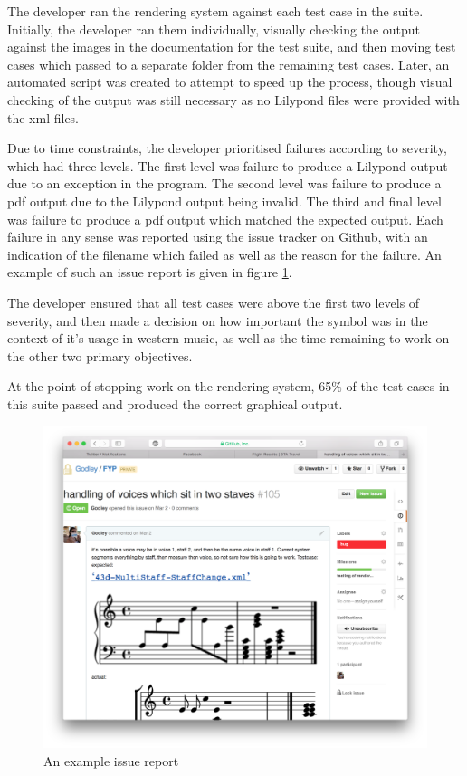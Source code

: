 The developer ran the rendering system against each test case in the suite. Initially, the developer ran them individually, visually checking the output against the images in the documentation for the test suite, and then moving test cases which passed to a separate folder from the remaining test cases. Later, an automated script was created to attempt to speed up the process, though visual checking of the output was still necessary as no Lilypond files were provided with the xml files.


Due to time constraints, the developer prioritised failures according to severity, which had three levels. The first level was failure to produce a Lilypond output due to an exception in the program. The second level was failure to produce a pdf output due to the Lilypond output being invalid. The third and final level was failure to produce a pdf output which matched the expected output. Each failure in any sense was reported using the issue tracker on Github, with an indication of the filename which failed as well as the reason for the failure. An example of such an issue report is given in figure \ref{fig:issue}.

The developer ensured that all test cases were above the first two levels of severity, and then made a decision on how important the symbol was in the context of it's usage in western music, as well as the time remaining to work on the other two primary objectives.

At the point of stopping work on the rendering system, 65$\%$ of the test cases in this suite passed and produced the correct graphical output. 
\begin{figure}[H]
	\centering
	\includegraphics[width=400pt]{issue_report}	
	\caption{An example issue report}
	\label{fig:issue}
\end{figure}

